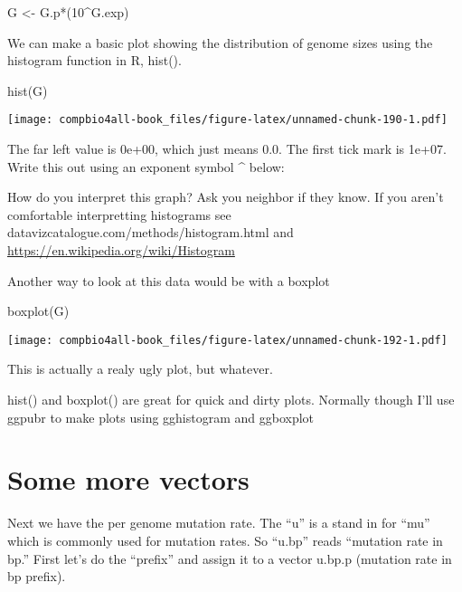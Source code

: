 \documentclass[
]{book}
\newenvironment{Shaded}{\begin{snugshade}}{\end{snugshade}}
\newcommand{\DecValTok}[1]{\textcolor[rgb]{0.00,0.00,0.81}{#1}}
\newcommand{\FunctionTok}[1]{\textcolor[rgb]{0.00,0.00,0.00}{#1}}
\newcommand{\NormalTok}[1]{#1}
\newcommand{\OtherTok}[1]{\textcolor[rgb]{0.56,0.35,0.01}{#1}}
\newcommand{\SpecialCharTok}[1]{\textcolor[rgb]{0.00,0.00,0.00}{#1}}
\begin{document}
\begin{Shaded}
\begin{Highlighting}[]
\NormalTok{G }\OtherTok{\textless{}{-}}\NormalTok{  G.p}\SpecialCharTok{*}\NormalTok{(}\DecValTok{10}\SpecialCharTok{\^{}}\NormalTok{G.exp)}
\end{Highlighting}
\end{Shaded}

We can make a basic plot showing the distribution of genome sizes using the histogram function in R, hist().

\begin{Shaded}
\begin{Highlighting}[]
\FunctionTok{hist}\NormalTok{(G)}
\end{Highlighting}
\end{Shaded}

\texttt{[image: compbio4all-book\_files/figure-latex/unnamed-chunk-190-1.pdf]}

The far left value is 0e+00, which just means 0.0. The first tick mark is 1e+07. Write this out using an exponent symbol \^{} below:

How do you interpret this graph? Ask you neighbor if they know. If you aren't comfortable interpretting histograms see datavizcatalogue.com/methods/histogram.html and \url{https://en.wikipedia.org/wiki/Histogram}

Another way to look at this data would be with a boxplot

\begin{Shaded}
\begin{Highlighting}[]
\FunctionTok{boxplot}\NormalTok{(G)}
\end{Highlighting}
\end{Shaded}

\texttt{[image: compbio4all-book\_files/figure-latex/unnamed-chunk-192-1.pdf]}

This is actually a realy ugly plot, but whatever.

hist() and boxplot() are great for quick and dirty plots. Normally though I'll use ggpubr to make plots using gghistogram and ggboxplot

\hypertarget{some-more-vectors}{%
\section{Some more vectors}\label{some-more-vectors}}

Next we have the per genome mutation rate. The ``u'' is a stand in for ``mu'' which is commonly used for mutation rates. So ``u.bp'' reads ``mutation rate in bp.'' First let's do the ``prefix'' and assign it to a vector u.bp.p (mutation rate in bp prefix).
\end{document}
